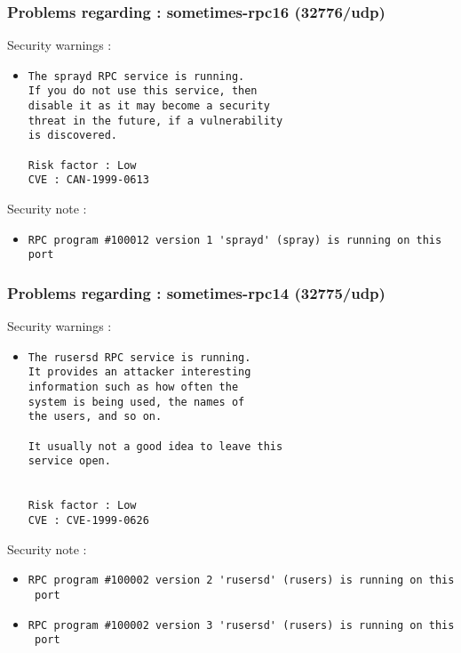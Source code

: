 \documentclass{article}
\begin{document}
\subsubsection{Problems regarding : sometimes-rpc16 (32776/udp)}
Security warnings :\\
\begin{itemize}
\item \begin{verbatim}
The sprayd RPC service is running. 
If you do not use this service, then
disable it as it may become a security
threat in the future, if a vulnerability
is discovered.

Risk factor : Low
CVE : CAN-1999-0613
\end{verbatim}\end{itemize}
Security note :\\
\begin{itemize}
\item \begin{verbatim}
RPC program #100012 version 1 'sprayd' (spray) is running on this port
\end{verbatim}\end{itemize}
\subsubsection{Problems regarding : sometimes-rpc14 (32775/udp)}
Security warnings :\\
\begin{itemize}
\item \begin{verbatim}
The rusersd RPC service is running. 
It provides an attacker interesting
information such as how often the
system is being used, the names of
the users, and so on.
 
It usually not a good idea to leave this
service open.


Risk factor : Low
CVE : CVE-1999-0626
\end{verbatim}\end{itemize}
Security note :\\
\begin{itemize}
\item \begin{verbatim}
RPC program #100002 version 2 'rusersd' (rusers) is running on this
 port
\end{verbatim}\item \begin{verbatim}
RPC program #100002 version 3 'rusersd' (rusers) is running on this
 port
\end{verbatim}\end{itemize}
\end{document}
